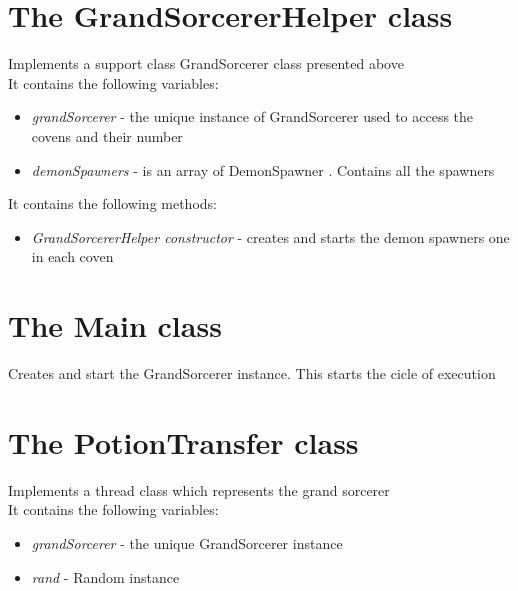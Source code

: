 \documentclass[14pt]{article}
\begin{document}
\section*{The GrandSorcererHelper class}
\vspace{5 mm}
Implements a support class GrandSorcerer class presented above\\
It contains the following variables:\\ 
\begin{itemize}
            \item \textit{grandSorcerer} - the unique instance of GrandSorcerer used to access the covens and their number
            \item \textit{demonSpawners} - is an array of DemonSpawner . Contains all the spawners 
\end{itemize}
It contains the following methods:\\
\begin{itemize}
            \item \textit{GrandSorcererHelper constructor} - creates and starts the demon spawners one in each coven
\end{itemize}

\section*{The Main class}
\vspace{5 mm}
Creates and start the GrandSorcerer instance. This starts the cicle of execution

\section*{The PotionTransfer class}
\vspace{5 mm}
Implements a thread class which represents the grand sorcerer\\
It contains the following variables:\\ 
\begin{itemize}
            \item \textit{grandSorcerer} - the unique GrandSorcerer instance
            \item \textit{rand} - Random instance
\end{itemize}
\end{document}
